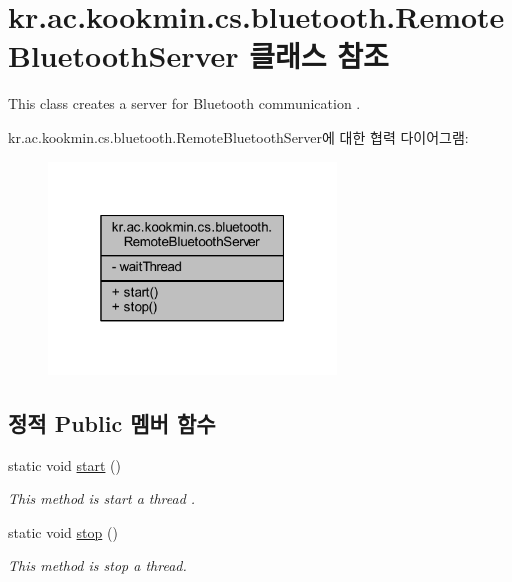 \hypertarget{classkr_1_1ac_1_1kookmin_1_1cs_1_1bluetooth_1_1_remote_bluetooth_server}{}\section{kr.\+ac.\+kookmin.\+cs.\+bluetooth.\+Remote\+Bluetooth\+Server 클래스 참조}
\label{classkr_1_1ac_1_1kookmin_1_1cs_1_1bluetooth_1_1_remote_bluetooth_server}


This class creates a server for Bluetooth communication .  




kr.\+ac.\+kookmin.\+cs.\+bluetooth.\+Remote\+Bluetooth\+Server에 대한 협력 다이어그램\+:\nopagebreak
\begin{figure}[H]
\begin{center}
\leavevmode
\includegraphics[width=217pt]{classkr_1_1ac_1_1kookmin_1_1cs_1_1bluetooth_1_1_remote_bluetooth_server__coll__graph}
\end{center}
\end{figure}
\subsection*{정적 Public 멤버 함수}
\begin{DoxyCompactItemize}
\item 
static void \hyperlink{classkr_1_1ac_1_1kookmin_1_1cs_1_1bluetooth_1_1_remote_bluetooth_server_a774982ffebe36c7fa3f37f9759ca0e04}{start} ()
\begin{DoxyCompactList}\small\item\em This method is start a thread . \end{DoxyCompactList}\item 
static void \hyperlink{classkr_1_1ac_1_1kookmin_1_1cs_1_1bluetooth_1_1_remote_bluetooth_server_aec4fd90c2189cd3ea869fedc5986727a}{stop} ()
\begin{DoxyCompactList}\small\item\em This method is stop a thread. \end{DoxyCompactList}\end{DoxyCompactItemize}
